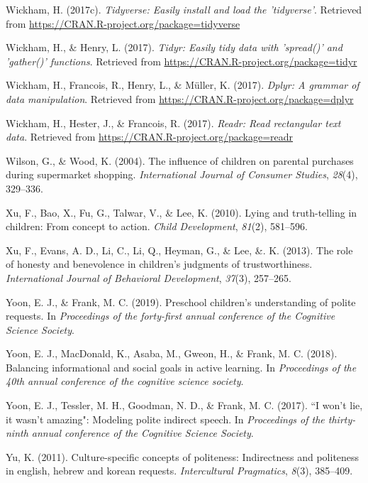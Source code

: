 \documentclass[oneside]{report}
\begin{document}
\hypertarget{ref-R-tidyverse}{}
Wickham, H. (2017c). \emph{Tidyverse: Easily install and load the
'tidyverse'}. Retrieved from
\url{https://CRAN.R-project.org/package=tidyverse}

\hypertarget{ref-R-tidyr}{}
Wickham, H., \& Henry, L. (2017). \emph{Tidyr: Easily tidy data with
'spread()' and 'gather()' functions}. Retrieved from
\url{https://CRAN.R-project.org/package=tidyr}

\hypertarget{ref-R-dplyr}{}
Wickham, H., Francois, R., Henry, L., \& Müller, K. (2017). \emph{Dplyr:
A grammar of data manipulation}. Retrieved from
\url{https://CRAN.R-project.org/package=dplyr}

\hypertarget{ref-R-readr}{}
Wickham, H., Hester, J., \& Francois, R. (2017). \emph{Readr: Read
rectangular text data}. Retrieved from
\url{https://CRAN.R-project.org/package=readr}

\hypertarget{ref-wilson2004}{}
Wilson, G., \& Wood, K. (2004). The influence of children on parental
purchases during supermarket shopping. \emph{International Journal of
Consumer Studies}, \emph{28}(4), 329--336.

\hypertarget{ref-xu2010}{}
Xu, F., Bao, X., Fu, G., Talwar, V., \& Lee, K. (2010). Lying and
truth-telling in children: From concept to action. \emph{Child
Development}, \emph{81}(2), 581--596.

\hypertarget{ref-xu2013}{}
Xu, F., Evans, A. D., Li, C., Li, Q., Heyman, G., \& Lee, \&. K. (2013).
The role of honesty and benevolence in children's judgments of
trustworthiness. \emph{International Journal of Behavioral Development},
\emph{37}(3), 257--265.

\hypertarget{ref-yoon2019}{}
Yoon, E. J., \& Frank, M. C. (2019). Preschool children's understanding
of polite requests. In \emph{Proceedings of the forty-first annual
conference of the Cognitive Science Society}.

\hypertarget{ref-yoon2018balancing}{}
Yoon, E. J., MacDonald, K., Asaba, M., Gweon, H., \& Frank, M. C.
(2018). Balancing informational and social goals in active learning. In
\emph{Proceedings of the 40th annual conference of the cognitive science
society}.

\hypertarget{ref-yoon2017}{}
Yoon, E. J., Tessler, M. H., Goodman, N. D., \& Frank, M. C. (2017). ``I
won't lie, it wasn't amazing": Modeling polite indirect speech. In
\emph{Proceedings of the thirty-ninth annual conference of the Cognitive
Science Society}.

\hypertarget{ref-yu2011}{}
Yu, K. (2011). Culture-specific concepts of politeness: Indirectness and
politeness in english, hebrew and korean requests. \emph{Intercultural
Pragmatics}, \emph{8}(3), 385--409.


\end{document}
